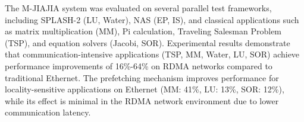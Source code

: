 The M-JIAJIA system was evaluated on several parallel test frameworks, including SPLASH-2 (LU, Water), NAS (EP, IS), and classical applications such as matrix multiplication (MM), Pi calculation, Traveling Salesman Problem (TSP), and equation solvers (Jacobi, SOR). Experimental results demonstrate that communication-intensive applications (TSP, MM, Water, LU, SOR) achieve performance improvements of 16\%-64\% on RDMA networks compared to traditional Ethernet. The prefetching mechanism improves performance for locality-sensitive applications on Ethernet (MM: 41\%, LU: 13\%, SOR: 12\%), while its effect is minimal in the RDMA network environment due to lower communication latency.


\pagestyle{enfrontmatterstyle}%
